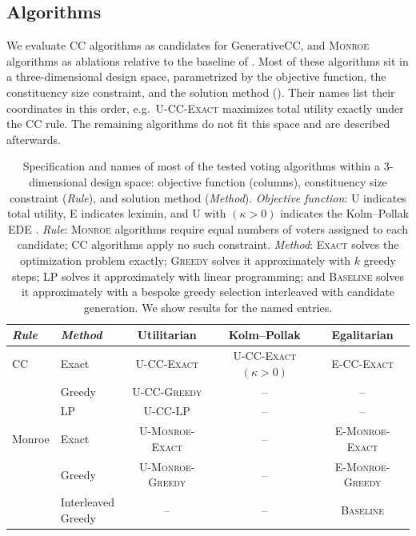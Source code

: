 \documentclass[letterpaper]{article} %
\newcommand{\Exact}{\textsc{U-CC-Exact}}
\newcommand{\ExactP}{\textsc{U-CC-Exact}$(\kappa>0)$}
\newcommand{\Greedy}{\textsc{U-CC-Greedy}}
\newcommand{\LP}{\textsc{U-CC-LP}}
\newcommand{\ExactMonroe}{\textsc{U-Monroe-Exact}}
\newcommand{\EExactMonroe}{\textsc{E-Monroe-Exact}}
\newcommand{\Baseline}{\textsc{Baseline}}
\newcommand{\ECCExact}{\textsc{E-CC-Exact}}
\newcommand{\GreedyMonroe}{\textsc{E-Monroe-Greedy}}
\newcommand{\UGreedyMonroe}{\textsc{U-Monroe-Greedy}}
\begin{document}
\subsection{Algorithms}
\label{sec:algorithms}

We evaluate \textsc{CC} algorithms as candidates for GenerativeCC, and \textsc{Monroe} algorithms as ablations relative to the baseline of \citet{fish-v2}.
Most of these algorithms sit in a three-dimensional design space, parametrized by the objective function, the constituency size constraint, and the solution method ().
Their names list their coordinates in this order, e.g.\ \Exact{} maximizes total utility exactly under the CC rule.
The remaining algorithms do not fit this space and are described afterwards.

\begin{table}[t]
\centering
\begin{tabular}{ll|ccc}
\hline
\textit{Rule} & \textit{Method} & Utilitarian & Kolm--Pollak & Egalitarian \\
\hline
CC & Exact & \Exact{} & \ExactP{} & \ECCExact{} \\
 & Greedy & \Greedy{} & -- & -- \\
 & LP & \LP{} & -- & -- \\
\hline
Monroe & Exact & \ExactMonroe{} & -- & \EExactMonroe{} \\
 & Greedy & \UGreedyMonroe{} & -- & \GreedyMonroe{} \\[3pt]
 & \makecell[l]{Interleaved\\Greedy} & -- & -- & \Baseline{} \\[2pt]
\hline
\end{tabular}
\caption{Specification and names of most of the tested voting algorithms within a 3-dimensional design space: objective function (columns), constituency size constraint (\textit{Rule}), and solution method (\textit{Method}). \textit{Objective function}: \textsc{U} indicates total utility, \textsc{E} indicates leximin, and \textsc{U} with \((\kappa>0)\) indicates the Kolm--Pollak EDE \citep{pollak-1971, kolm-1976}. \textit{Rule}: \textsc{Monroe} algorithms require equal numbers of voters assigned to each candidate; \textsc{CC} algorithms apply no such constraint. \textit{Method}: \textsc{Exact} solves the optimization problem exactly; \textsc{Greedy} solves it approximately with \(k\) greedy steps; \textsc{LP} solves it approximately with linear programming; and \Baseline{} solves it approximately with a bespoke greedy selection interleaved with candidate generation. We show results for the named entries.}
\label{tab:algorithm-space}
\end{table}
\end{document}

